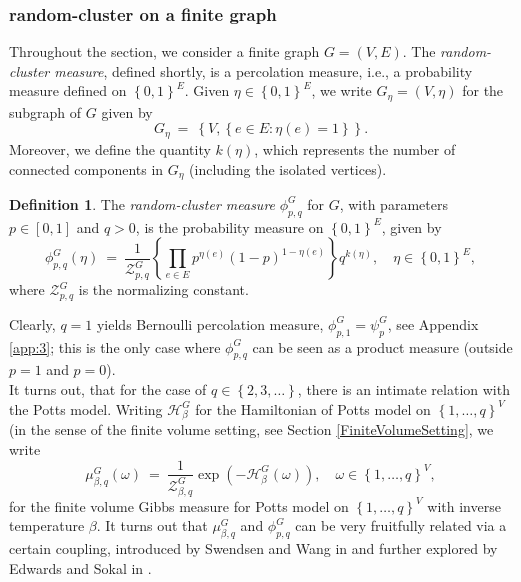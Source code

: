 \documentclass[12pt]{article}
\renewcommand{\H}{\mathcal{H}}
\newcommand{\ZZ}{\mathcal{Z}}
\newcommand{\set}[1]{\left\{#1\right\}}
\newcommand{\1}{\mathbbm{1}}
\newcommand{\5}{\vspace{0.5cm}}
\theoremstyle{definition}
\newtheorem{df}[thm]{Definition}
\begin{document}

\subsubsection{random-cluster on a finite graph}

Throughout the section, we consider a finite graph $G=(V,E)$. The \textit{random-cluster measure}, defined shortly, is a percolation measure, i.e., a probability measure defined on $\set{0,1}^E$. Given $\eta\in\set{0,1}^E$, we write $G_\eta=(V,\eta)$ for the subgraph of $G$ given by 
$$G_\eta ~=~ \set{V,\set{e\in E:\eta(e)=1}}.$$
Moreover, we define the quantity $k(\eta)$, which represents the number of connected components in $G_\eta$ (including the isolated vertices). 

\begin{df}
The \textit{random-cluster measure} $\phi_{p,q}^G$ for $G$, with parameters $p\in[0,1]$ and $q>0$, is the probability measure on $\set{0,1}^E$, given by
$$\phi_{p,q}^{G}(\eta) ~=~ \frac{1}{\ZZ_{p,q}^G}\set{\prod_{e\in E}p^{\eta(e)}(1-p)^{1-\eta(e)}}q^{k(\eta)}, \quad \eta\in\set{0,1}^E,$$
where $\ZZ_{p,q}^{G}$ is the normalizing constant.
\end{df} 

Clearly, $q=1$ yields Bernoulli percolation measure, $\phi_{p,1}^G=\psi_{p}^G$, see Appendix \ref{app:3}; this is the only case where $\phi_{p,q}^G$ can be seen as a product measure (outside $p=1$ and $p=0$). \\

It turns out, that for the case of $q\in\set{2,3,\ldots}$, there is an intimate relation with the Potts model. Writing $\H_\beta^G$ for the Hamiltonian of Potts model on $\set{1,\ldots,q}^V$ (in the sense of the finite volume setting, see Section \ref{FiniteVolumeSetting}, we write
$$\mu_{\beta,q}^G(\omega) ~=~ \frac{1}{\ZZ_{\beta,q}^G}\exp(-\H_\beta^G(\omega)), \quad \omega\in\set{1,\ldots,q}^V,$$
for the finite volume Gibbs measure for Potts model on $\set{1,\ldots,q}^V$ with inverse temperature $\beta$. It turns out that $\mu_{\beta,q}^G$ and $\phi_{p,q}^G$ can be very fruitfully related via a certain coupling, introduced by Swendsen and Wang in \cite{SW} and further explored  by Edwards and Sokal in \cite{ES}.
\end{document}

